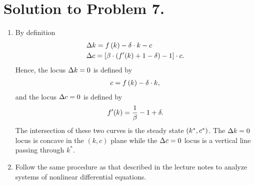 \documentclass[letterpaper,12pt,leqno]{article}
\begin{document}
\section*{Solution to Problem 7.}

\begin{enumerate}
\item By definition
\begin{align*}
\Delta &k=f\left( k \right) -\delta\cdot  k-c \\
\Delta &c=\left[ \beta \cdot \left( f'(k) +1-\delta \right) -1 \right]\cdot  c.
\end{align*}
Hence, the locus $\Delta k=0$ is defined by
\begin{align*}
c=f\left( k \right) -\delta\cdot  k,
\end{align*}
and the locus $\Delta c=0$ is defined by
\begin{align*}
f'(k) =\frac{1}{\beta}-1+\delta.
\end{align*}
The intersection of these two curves is the steady state $\left( k^*,c^* \right) $. The $\Delta k=0$ locus is concave in the $(k,c)$ plane while the $\Delta c=0$ locus is a vertical line passing through $k^*$.

\item Follow the same procedure as that described in the lecture notes to analyze systems of nonlinear differential equations.
\end{enumerate}
\end{document}
